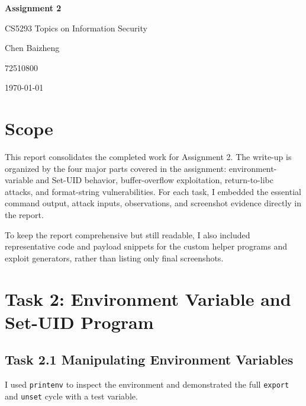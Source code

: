 \documentclass[11pt]{article}
\begin{document}
\hypersetup{pageanchor = false}

\begin{titlepage}
    \centering
    \vspace*{2.5cm}
    {\Huge \bfseries Assignment 2 \par}
    \vspace{1.2cm}
    {\Large CS5293 Topics on Information Security \par}
    \vspace{2cm}
    {\Large Chen Baizheng \par}
    \vspace{0.3cm}
    {\large 72510800 \par}
    \vfill
    {\large \today \par}
\end{titlepage}

\tableofcontents
\newpage
\hypersetup{pageanchor = true}

\section{Scope}

This report consolidates the completed work for Assignment 2. The write-up is organized by the four major parts covered in the assignment: environment-variable and Set-UID behavior, buffer-overflow exploitation, return-to-libc attacks, and format-string vulnerabilities. For each task, I embedded the essential command output, attack inputs, observations, and screenshot evidence directly in the report.

To keep the report comprehensive but still readable, I also included representative code and payload snippets for the custom helper programs and exploit generators, rather than listing only final screenshots.

\section{Task 2: Environment Variable and Set-UID Program}

\subsection{Task 2.1 Manipulating Environment Variables}

I used \texttt{printenv} to inspect the environment and demonstrated the full \texttt{export} and \texttt{unset} cycle with a test variable.
\end{document}
